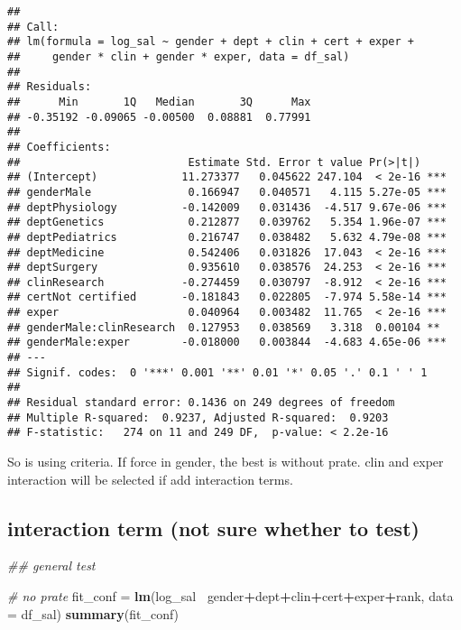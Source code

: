 \documentclass[]{article}
\newenvironment{Shaded}{\begin{snugshade}}{\end{snugshade}}
\newcommand{\CommentTok}[1]{\textcolor[rgb]{0.56,0.35,0.01}{\textit{#1}}}
\newcommand{\DataTypeTok}[1]{\textcolor[rgb]{0.13,0.29,0.53}{#1}}
\newcommand{\KeywordTok}[1]{\textcolor[rgb]{0.13,0.29,0.53}{\textbf{#1}}}
\newcommand{\NormalTok}[1]{#1}
\newcommand{\OperatorTok}[1]{\textcolor[rgb]{0.81,0.36,0.00}{\textbf{#1}}}
\newcommand{\StringTok}[1]{\textcolor[rgb]{0.31,0.60,0.02}{#1}}
\begin{document}
\begin{verbatim}
## 
## Call:
## lm(formula = log_sal ~ gender + dept + clin + cert + exper + 
##     gender * clin + gender * exper, data = df_sal)
## 
## Residuals:
##      Min       1Q   Median       3Q      Max 
## -0.35192 -0.09065 -0.00500  0.08881  0.77991 
## 
## Coefficients:
##                          Estimate Std. Error t value Pr(>|t|)    
## (Intercept)             11.273377   0.045622 247.104  < 2e-16 ***
## genderMale               0.166947   0.040571   4.115 5.27e-05 ***
## deptPhysiology          -0.142009   0.031436  -4.517 9.67e-06 ***
## deptGenetics             0.212877   0.039762   5.354 1.96e-07 ***
## deptPediatrics           0.216747   0.038482   5.632 4.79e-08 ***
## deptMedicine             0.542406   0.031826  17.043  < 2e-16 ***
## deptSurgery              0.935610   0.038576  24.253  < 2e-16 ***
## clinResearch            -0.274459   0.030797  -8.912  < 2e-16 ***
## certNot certified       -0.181843   0.022805  -7.974 5.58e-14 ***
## exper                    0.040964   0.003482  11.765  < 2e-16 ***
## genderMale:clinResearch  0.127953   0.038569   3.318  0.00104 ** 
## genderMale:exper        -0.018000   0.003844  -4.683 4.65e-06 ***
## ---
## Signif. codes:  0 '***' 0.001 '**' 0.01 '*' 0.05 '.' 0.1 ' ' 1
## 
## Residual standard error: 0.1436 on 249 degrees of freedom
## Multiple R-squared:  0.9237, Adjusted R-squared:  0.9203 
## F-statistic:   274 on 11 and 249 DF,  p-value: < 2.2e-16
\end{verbatim}

So is using criteria. If force in gender, the best is without prate.
clin and exper interaction will be selected if add interaction terms.

\hypertarget{interaction-term-not-sure-whether-to-test}{%
\subsection{interaction term (not sure whether to
test)}\label{interaction-term-not-sure-whether-to-test}}

\begin{Shaded}
\begin{Highlighting}[]
\CommentTok{## general test }

\CommentTok{# no prate}
\NormalTok{fit_conf =}\StringTok{ }\KeywordTok{lm}\NormalTok{(log_sal }\OperatorTok{~}\NormalTok{gender}\OperatorTok{+}\NormalTok{dept}\OperatorTok{+}\NormalTok{clin}\OperatorTok{+}\NormalTok{cert}\OperatorTok{+}\NormalTok{exper}\OperatorTok{+}\NormalTok{rank, }\DataTypeTok{data =}\NormalTok{ df_sal)}
\KeywordTok{summary}\NormalTok{(fit_conf)}
\end{Highlighting}
\end{Shaded}
\end{document}
